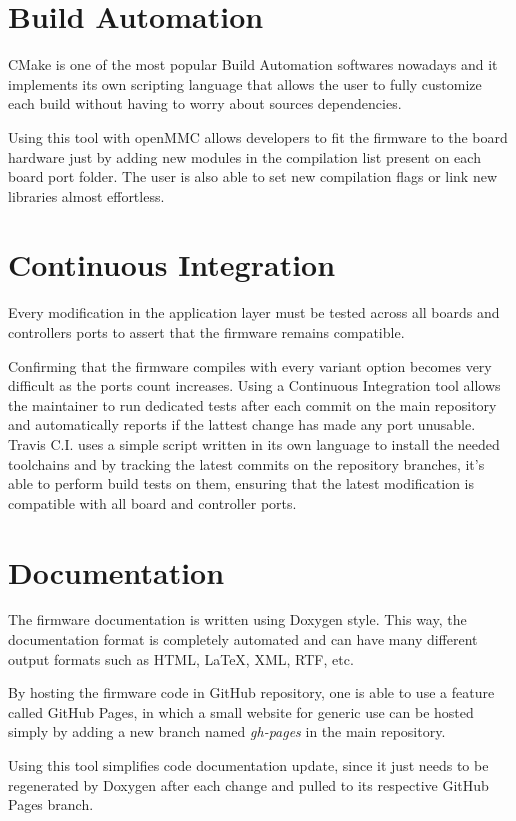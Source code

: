 \documentclass[a4paper,
              ]{jacow}
\begin{document}
\section{Build Automation}
CMake is one of the most popular Build Automation softwares nowadays and it implements its own scripting language that allows the user to fully customize each build without having to worry about sources dependencies.

Using this tool with openMMC allows developers to fit the firmware to the board hardware just by adding new modules in the compilation list present on each board port folder.
The user is also able to set new compilation flags or link new libraries almost effortless.

\section{Continuous Integration}
Every modification in the application layer must be tested across all boards and controllers ports to assert that the firmware remains compatible.

Confirming that the firmware compiles with every variant option becomes very difficult as the ports count increases.
Using a Continuous Integration tool allows the maintainer to run dedicated tests after each commit on the main repository and automatically reports if the lattest change has made any port unusable.
Travis C.I. uses a simple script written in its own language to install the needed toolchains and by tracking the latest commits on the repository branches, it's able to perform build tests on them, ensuring that the latest modification is compatible with all board and controller ports.

\section{Documentation}
The firmware documentation is written using Doxygen style. This way, the documentation format is completely automated and can have many different output formats such as HTML, \LaTeX , XML, RTF, etc.

By hosting the firmware code in GitHub repository, one is able to use a feature called GitHub Pages, in which a small website for generic use can be hosted simply by adding a new branch named \emph{gh-pages} in the main repository.

Using this tool simplifies code documentation update, since it just needs to be regenerated by Doxygen after each change and pulled to its respective GitHub Pages branch.
\end{document}
